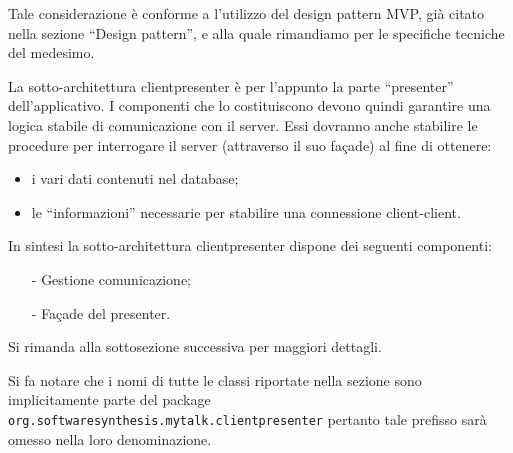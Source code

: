 Tale considerazione è conforme a l'utilizzo del design pattern MVP, già citato nella sezione ``Design pattern'', e alla quale rimandiamo per le specifiche tecniche del medesimo.

La sotto-architettura clientpresenter è per l'appunto la parte ``presenter'' dell'applicativo. I componenti che lo costituiscono devono quindi garantire una logica stabile di comunicazione con il server. Essi dovranno anche stabilire le procedure per interrogare il server (attraverso il suo façade) al fine di ottenere:
\begin{itemize}
	\item i vari dati contenuti nel database;
	\item le ``informazioni'' necessarie per stabilire una connessione client-client.
\end{itemize}

In sintesi la sotto-architettura clientpresenter dispone dei seguenti componenti:
\begin{itemize}[noitemsep,nolistsep]
	\item[-] Gestione comunicazione;
	\item[-] Façade del presenter.
\end{itemize}
Si rimanda alla sottosezione successiva per maggiori dettagli.

Si fa notare che i nomi di tutte le classi riportate nella sezione sono implicitamente parte del package \texttt{org.softwaresynthesis.mytalk.clientpresenter} pertanto tale prefisso sarà omesso nella loro denominazione.

